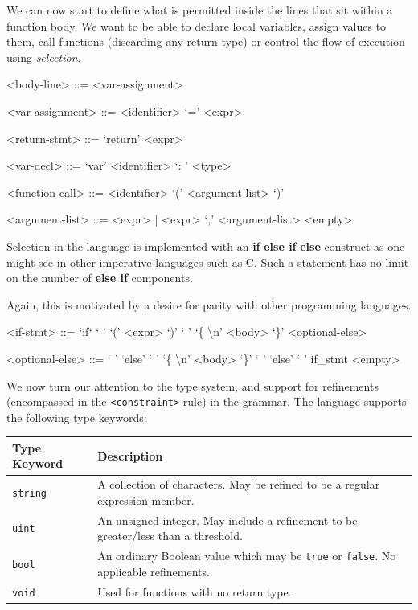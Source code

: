 \documentclass[a4paper,openany,12pt]{book}
\begin{document}
We can now start to define what is permitted inside the lines that sit within a function body.
We want to be able to declare local variables, assign values to them, call functions (discarding any return type) or
control the flow of execution using \emph{selection}.

\begin{grammar}
    <body-line> ::= <var-assignment>

    <var-assignment> ::= <identifier> `=' <expr>

    <return-stmt> ::= `return' <expr>

    <var-decl> ::= `var' <identifier> `: ' <type>

    <function-call> ::= <identifier> `(' <argument-list> `)'

    <argument-list> ::= <expr> | <expr> `,' <argument-list>
    \alt <empty>
\end{grammar}

Selection in the language is implemented with an \textbf{if}-\textbf{else if}-\textbf{else} construct
as one might see in other imperative languages such as C.
Such a statement has no limit on the number of \textbf{else if} components.

Again, this is motivated by a desire for parity with other programming languages.

\begin{grammar}
    <if-stmt> ::= `if` ` ' `(' <expr> `)' ` ' `\{ \textbackslash n' <body> `\}' <optional-else>

    <optional-else> ::= ` ' `else' ` ' `\{ \textbackslash n' <body> `\}' \alt ` ' `else' ` ' if_stmt \alt <empty>

\end{grammar}

We now turn our attention to the type system, and support for refinements (encompassed in the \texttt{<constraint>} rule) in the grammar.
The language supports the following type keywords:

\begin{table}[H]

    \centering
    \begin{tabular}[t]{|p{3cm}|p{8cm}|}
        \hline
        \rowcolor{id7-aubergine}
        {\color[HTML]{FFFFFF} \sffamily \textbf{Type Keyword}} & {\color[HTML]{FFFFFF} \sffamily \textbf{Description}} \\ \hline
        \texttt{string} & A collection of characters. May be refined to be a regular expression member. \\ \hline
        \texttt{uint} & An unsigned integer. May include a refinement to be greater/less than a threshold. \\ \hline
        \texttt{bool} & An ordinary Boolean value which may be \texttt{true} or \texttt{false}. No applicable refinements. \\ \hline
        \texttt{void} & Used for functions with no return type. \\ \hline
    \end{tabular}
\end{table}
\end{document}

